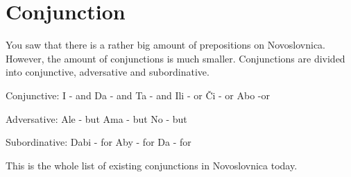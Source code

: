 \section{Conjunction}

You saw that there is a rather big amount of prepositions on Novoslovnica. However, the amount of conjunctions is much smaller. 
Conjunctions are divided into conjunctive, adversative and subordinative. 

Conjunctive:
I - and
Da - and
Ta - and
Ili - or
Či - or
Abo -or

Adversative:
Ale - but
Ama - but
No - but

Subordinative:
Dabi - for
Aby - for
Da - for

This is the whole list of existing conjunctions in Novoslovnica today.
